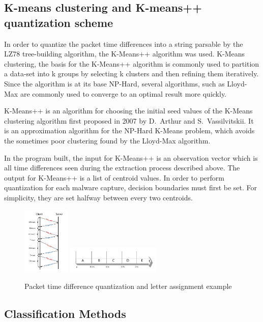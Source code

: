 \documentclass[9pt,journal,compsoc]{IEEEtran}
\begin{document}
\subsection{K-means clustering and K-means++ quantization scheme}
In order to quantize the packet time differences into a string parsable by the LZ78 tree-building algorithm, the K-Means++ algorithm was used.
K-Means clustering, the basis for the K-Means++ algorithm is commonly used to partition a data-set into k groups by selecting k clusters and then refining them iteratively. Since the algorithm is at its base NP-Hard, several algorithms, such as Lloyd-Max are commonly used to converge to an optimal result more quickly.

K-Means++ \cite{Art07} is an algorithm for choosing the initial seed values of the K-Means clustering algorithm first proposed in 2007 by D.~Arthur and S.~Vassilvitskii. It is an approximation algorithm for the NP-Hard K-Means problem, which avoids the sometimes poor clustering found by the Lloyd-Max algorithm.

In the program built, the input for K-Means++ is an observation vector which is all time differences seen during the extraction process described above.
The output for K-Means++ is a list of centroid values.
In order to perform quantization for each malware capture, decision boundaries must first be set. For simplicity, they are set halfway between every two centroids.
\begin{figure}[!h]
 \centering
 \includegraphics[width=0.2\textwidth]{fig2.pdf}
 \includegraphics[width=0.4\textwidth]{fig3.pdf}
 \caption{Packet time difference quantization and letter assignment example\label{fig:packetquant}}
\end{figure} 
\subsection{Classification Methods}
\end{document}
